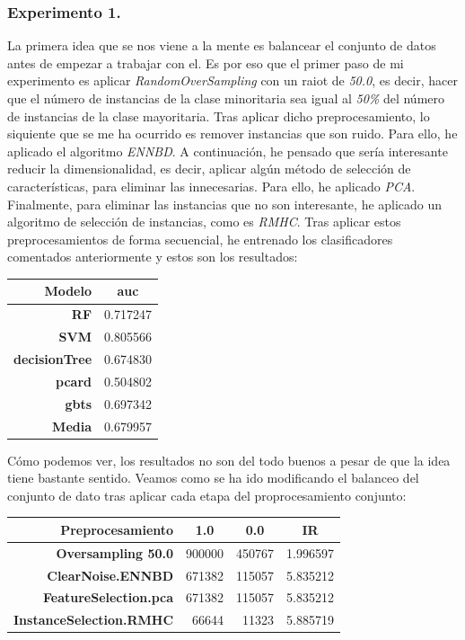 \documentclass[11pt]{article}
\begin{document}
\subsubsection{Experimento 1.}

La primera idea que se nos viene a la mente es balancear el conjunto de datos antes de empezar a trabajar con el. Es por eso que el primer paso de mi experimento es aplicar \textit{RandomOverSampling} con un raiot de \textit{50.0}, es decir, hacer que el número de instancias de la clase minoritaria sea igual al \textit{50\%} del número de instancias de la clase mayoritaria. Tras aplicar dicho preprocesamiento, lo siquiente que se me ha ocurrido es remover instancias que son ruido. Para ello, he aplicado el algoritmo \textit{ENNBD}. A continuación, he pensado que sería interesante reducir la dimensionalidad, es decir, aplicar algún método de selección de características, para eliminar las innecesarias. Para ello, he aplicado \textit{PCA}. Finalmente, para eliminar las instancias que no son interesante, he aplicado un algoritmo de selección de instancias, como es \textit{RMHC}. Tras aplicar estos preprocesamientos de forma secuencial, he entrenado los clasificadores comentados anteriormente y estos son los resultados:

\begin{table}[H]
	\centering
	\begin{tabular}{rc}
		\textbf{Modelo} & \textbf{auc} \\ \hline
		\textbf{RF} & 0.717247 \\
		\textbf{SVM} & 0.805566 \\
		\textbf{decisionTree} & 0.674830 \\
		\textbf{pcard} & 0.504802 \\
		\textbf{gbts} & 0.697342 \\ \hline
		\textbf{Media} & 0.679957
	\end{tabular}
\end{table}

Cómo podemos ver, los resultados no son del todo buenos a pesar de que la idea tiene bastante sentido. Veamos como se ha ido modificando el balanceo del conjunto de dato tras aplicar cada etapa del proprocesamiento conjunto:

\begin{table}[H]
	\centering
	\begin{tabular}{rrrr}
		\textbf{Preprocesamiento} & \multicolumn{1}{c}{\textbf{1.0}} & \multicolumn{1}{c}{\textbf{0.0}} & \multicolumn{1}{c}{\textbf{IR}} \\ \hline
		\textbf{Oversampling 50.0} & 900000 & 450767 & 1.996597 \\
		\textbf{ClearNoise.ENNBD} & 671382 & 115057 & 5.835212 \\
		\textbf{FeatureSelection.pca} & 671382 & 115057 & 5.835212 \\
		\textbf{InstanceSelection.RMHC} & 66644 & 11323 & 5.885719
	\end{tabular}
\end{table}
\end{document}
